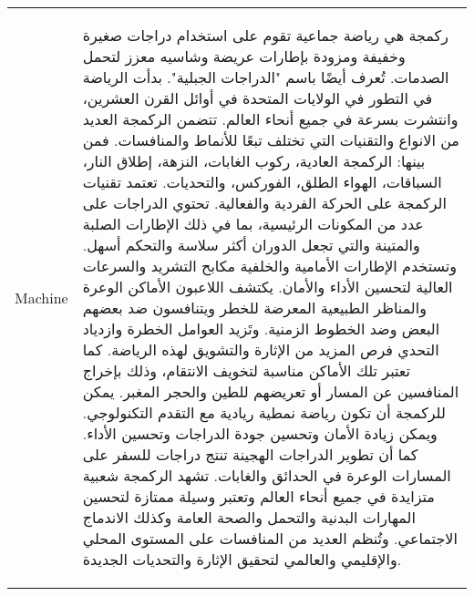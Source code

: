 \begin{center}
\begin{supertabular}{l | p{12cm}}
        \midrule
        Machine & 
        {\small \begin{RLtext}

        ركمجة هي رياضة جماعية تقوم على استخدام دراجات صغيرة وخفيفة ومزودة بإطارات عريضة وشاسيه معزز لتحمل الصدمات. تُعرف أيضًا باسم "الدراجات الجبلية". بدأت الرياضة في التطور في الولايات المتحدة في أوائل القرن العشرين، وانتشرت بسرعة في جميع أنحاء العالم. تتضمن الركمجة العديد من الانواع والتقنيات التي تختلف تبعًا للأنماط والمنافسات. فمن بينها: الركمجة العادية، ركوب الغابات، النزهة، إطلاق النار، السباقات، الهواء الطلق، الفوركس، والتحديات. تعتمد تقنيات الركمجة على الحركة الفردية والفعالية. تحتوي الدراجات على عدد من المكونات الرئيسية، بما في ذلك الإطارات الصلبة والمتينة والتي تجعل الدوران أكثر سلاسة والتحكم أسهل. وتستخدم الإطارات الأمامية والخلفية مكابح التشريد والسرعات العالية لتحسين الأداء والأمان. يكتشف اللاعبون الأماكن الوعرة والمناظر الطبيعية المعرضة للخطر ويتنافسون ضد بعضهم البعض وضد الخطوط الزمنية. وتَزيد العوامل الخطرة وازدياد التحدي فرص المزيد من الإثارة والتشويق لهذه الرياضة. كما تعتبر تلك الأماكن مناسبة لتخويف الانتقام، وذلك بإخراج المنافسين عن المسار أو تعريضهم للطين والحجر المغبر. يمكن للركمجة أن تكون رياضة نمطية ريادية مع التقدم التكنولوجي. ويمكن زيادة الأمان وتحسين جودة الدراجات وتحسين الأداء. كما أن تطوير الدراجات الهجينة تنتج دراجات للسفر على المسارات الوعرة في الحدائق والغابات. تشهد الركمجة شعبية متزايدة في جميع أنحاء العالم وتعتبر وسيلة ممتازة لتحسين المهارات البدنية والتحمل والصحة العامة وكذلك الاندماج الاجتماعي. وتُنظم العديد من المنافسات على المستوى المحلي والإقليمي والعالمي لتحقيق الإثارة والتحديات الجديدة.

            \end{RLtext}}\\
    

\end{supertabular}
\end{center}
